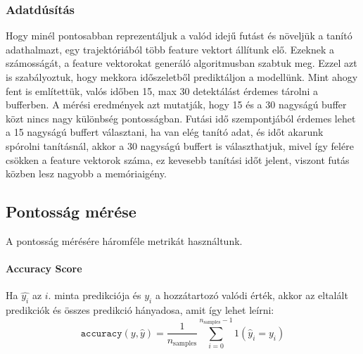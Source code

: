 \documentclass[12pt,a4paper]{article}
\begin{document}
\subsubsection{Adatdúsítás}
Hogy minél pontosabban reprezentáljuk a valód idejű futást és növeljük a tanító adathalmazt, egy trajektóriából több feature vektort állítunk elő.
Ezeknek a számosságát, a feature vektorokat generáló algoritmusban szabtuk meg. Ezzel azt is szabályoztuk, hogy mekkora időszeletből prediktáljon
a modellünk. Mint ahogy fent is említettük, valós időben 15, max 30 detektálást érdemes tárolni a bufferben. A mérési eredmények azt mutatják, hogy
15 és a 30 nagyságú buffer közt nincs nagy különbség pontosságban. Futási idő szempontjából érdemes lehet a 15 nagyságú buffert választani,
ha van elég tanító adat, és időt akarunk spórolni tanításnál, akkor a 30 nagyságú buffert is választhatjuk, mivel így felére csökken a feature vektorok száma, ez kevesebb tanítási időt jelent, viszont futás közben lesz nagyobb a memóriaigény.
\subsection{Pontosság mérése}
A pontosság mérésére háromféle metrikát használtunk.
\paragraph{Accuracy Score}
Ha \begin{math}\hat{y_i}\end{math} az \begin{math}i\end{math}. minta predikciója és \begin{math}y_i\end{math} a hozzátartozó valódi érték,
akkor az eltalált predikciók és összes predikció hányadosa, amit így lehet leírni:\break
\begin{equation}
    \texttt{accuracy}(y, \hat{y}) = \frac{1}{n_\text{samples}} \sum_{i=0}^{n_\text{samples}-1} 1(\hat{y}_i = y_i)
\end{equation}
\end{document}
